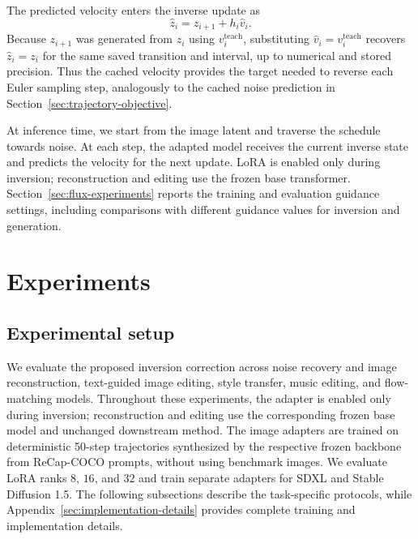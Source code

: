 \documentclass{article} %
\newcommand{\alek}[1]{{\color{purple}{alek: #1}}}
\begin{document}
The predicted velocity enters the inverse update as
\begin{equation}
 \hat z_i=z_{i+1}+h_i\hat v_i.
 \label{eq:flow-inverse-step}
\end{equation}
\alek{Comment}
Because $z_{i+1}$ was generated from $z_i$ using $v_i^{\mathrm{teach}}$,
substituting $\hat v_i=v_i^{\mathrm{teach}}$ recovers $\hat z_i=z_i$
for the same saved transition and interval, up to numerical and stored
precision. Thus the cached velocity provides the target needed to reverse
each Euler sampling step, analogously to the cached noise prediction in
Section~\ref{sec:trajectory-objective}.

At inference time, we start from the image latent and traverse the schedule
towards noise. At each step, the adapted model receives the current inverse
state and predicts the velocity for the next update. LoRA is enabled only
during inversion; reconstruction and editing use the frozen base
transformer. Section~\ref{sec:flux-experiments} reports the training and
evaluation guidance settings, including comparisons with different guidance
values for inversion and generation.

\section{Experiments}

\subsection{Experimental setup}
We evaluate the proposed inversion correction across noise recovery and image reconstruction, text-guided image editing, style transfer, music editing, and flow-matching models. Throughout these experiments, the adapter is enabled only during inversion; reconstruction and editing use the corresponding frozen base model and unchanged downstream method. The image adapters are trained on deterministic 50-step trajectories synthesized by the respective frozen backbone from ReCap-COCO prompts, without using benchmark images. We evaluate LoRA ranks $8$, $16$, and $32$ and train separate adapters for SDXL and Stable Diffusion 1.5. The following subsections describe the task-specific protocols, while Appendix~\ref{sec:implementation-details} provides complete training and implementation details.
\end{document}
